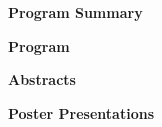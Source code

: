 \documentclass[11pt,twoside,letter]{article}
\begin{document}


\clearpage\pagestyle{plain}
\centerline{\bfseries\LARGE  Program Summary}

\cleardoublepage

\centerline{\bfseries\LARGE  Program}



\cleardoublepage

\centerline{\bfseries\LARGE  Abstracts}

\cleardoublepage

\cleardoublepage


\centerline{\bfseries\LARGE  Poster Presentations}


\printindex
\end{document}
